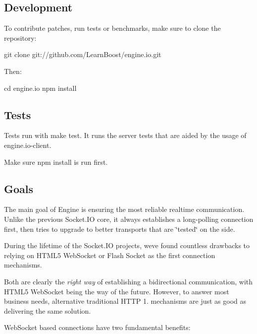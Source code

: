 \subsection*{Development}

To contribute patches, run tests or benchmarks, make sure to clone the repository\+:


\begin{DoxyCode}
git clone git://github.com/LearnBoost/engine.io.git
\end{DoxyCode}


Then\+:


\begin{DoxyCode}
cd engine.io
npm install
\end{DoxyCode}


\subsection*{Tests}

Tests run with {\ttfamily make test}. It runs the server tests that are aided by the usage of {\ttfamily engine.\+io-\/client}.

Make sure {\ttfamily npm install} is run first.

\subsection*{Goals}

The main goal of {\ttfamily Engine} is ensuring the most reliable realtime communication. Unlike the previous Socket.\+IO core, it always establishes a long-\/polling connection first, then tries to upgrade to better transports that are \char`\"{}tested\char`\"{} on the side.

During the lifetime of the Socket.\+IO projects, we\textquotesingle{}ve found countless drawbacks to relying on {\ttfamily H\+T\+M\+L5 Web\+Socket} or {\ttfamily Flash Socket} as the first connection mechanisms.

Both are clearly the {\itshape right way} of establishing a bidirectional communication, with H\+T\+M\+L5 Web\+Socket being the way of the future. However, to answer most business needs, alternative traditional H\+T\+TP 1. mechanisms are just as good as delivering the same solution.

Web\+Socket based connections have two fundamental benefits\+:


